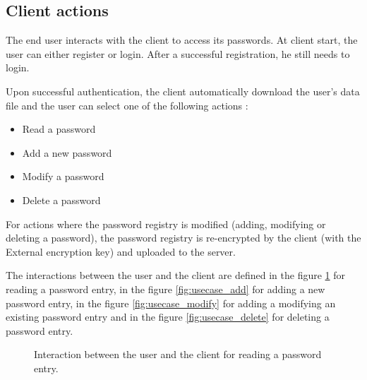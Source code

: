 \documentclass[../report.tex]{subfiles}
\begin{document}
\subsection{Client actions}
The end user interacts with the client to access its passwords.
At client start, the user can either register or login.
After a successful registration, he still needs to login.

Upon successful authentication, the client automatically download the user's data file and the user can select one of the following actions :
\begin{itemize}
 \item Read a password
 \item Add a new password
 \item Modify a password
 \item Delete a password
\end{itemize}
For actions where the password registry is modified (adding, modifying or deleting a password), the password registry is re-encrypted by the client (with the External encryption key) and uploaded to the server.

The interactions between the user and the client are defined in the figure \ref{fig:usecase_read} for reading a password entry, in the figure \ref{fig:usecase_add} for adding a new password entry, in the figure \ref{fig:usecase_modify} for adding a modifying an existing password entry and in the figure \ref{fig:usecase_delete} for deleting a password entry.



\begin{figure}[h]
 \centering
 \setlength{\fboxsep}{10pt}
 \setlength{\fboxrule}{1pt}
 \caption{Interaction between the user and the client for reading a password entry.}
 \label{fig:usecase_read}
\end{figure}
\end{document}
